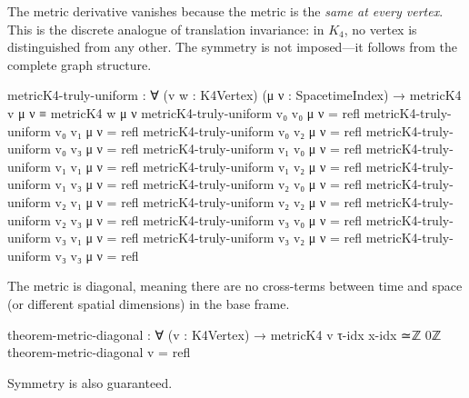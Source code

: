 \documentclass[11pt,a4paper]{book}
\begin{document}
The metric derivative vanishes because the metric is the \emph{same at every vertex}. This is the discrete analogue of translation invariance: in $K_4$, no vertex is distinguished from any other. The symmetry is not imposed---it follows from the complete graph structure.

\begin{code}
metricK4-truly-uniform : ∀ (v w : K4Vertex) (μ ν : SpacetimeIndex) →
  metricK4 v μ ν ≡ metricK4 w μ ν
metricK4-truly-uniform v₀ v₀ μ ν = refl
metricK4-truly-uniform v₀ v₁ μ ν = refl
metricK4-truly-uniform v₀ v₂ μ ν = refl
metricK4-truly-uniform v₀ v₃ μ ν = refl
metricK4-truly-uniform v₁ v₀ μ ν = refl
metricK4-truly-uniform v₁ v₁ μ ν = refl
metricK4-truly-uniform v₁ v₂ μ ν = refl
metricK4-truly-uniform v₁ v₃ μ ν = refl
metricK4-truly-uniform v₂ v₀ μ ν = refl
metricK4-truly-uniform v₂ v₁ μ ν = refl
metricK4-truly-uniform v₂ v₂ μ ν = refl
metricK4-truly-uniform v₂ v₃ μ ν = refl
metricK4-truly-uniform v₃ v₀ μ ν = refl
metricK4-truly-uniform v₃ v₁ μ ν = refl
metricK4-truly-uniform v₃ v₂ μ ν = refl
metricK4-truly-uniform v₃ v₃ μ ν = refl
\end{code}

The metric is diagonal, meaning there are no cross-terms between time and space (or different spatial dimensions) in the base frame.

\begin{code}
theorem-metric-diagonal : ∀ (v : K4Vertex) → metricK4 v τ-idx x-idx ≃ℤ 0ℤ
theorem-metric-diagonal v = refl
\end{code}

Symmetry is also guaranteed.
\end{document}
